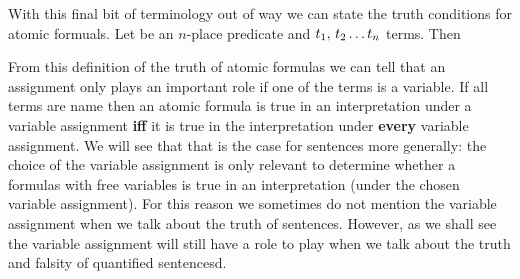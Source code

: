 With this final bit of terminology out of way we can state the truth conditions for atomic formuals. Let  be an $n$-place predicate and $t_1,\,t_2\ldots t_{n}$ terms. Then


From this definition of the truth of atomic formulas we can tell that an assignment only plays an important role if one of the terms is a variable. If all terms are name then an atomic formula is true in an interpretation under a variable assignment \textbf{iff} it is true in the interpretation under \textbf{every} variable assignment. We will see that that is the case for sentences more generally: the choice of the variable assignment is only relevant to determine whether a formulas with free variables is true in an interpretation (under the chosen variable assignment). For this reason we sometimes do not mention the variable assignment when we talk about the truth of sentences. However, as we shall see the variable assignment will still have a role to play when we talk about the truth and falsity of quantified sentencesd.

